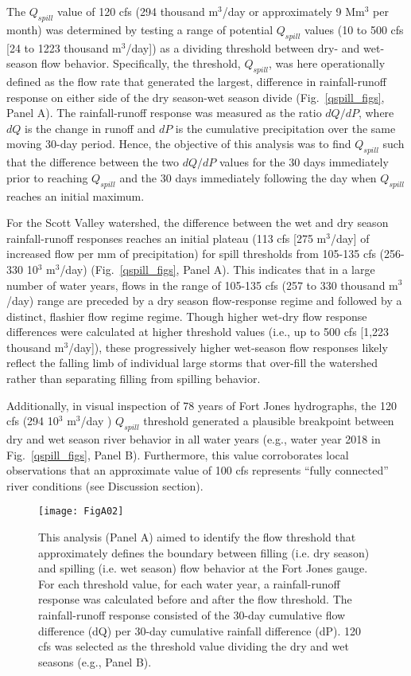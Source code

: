 \documentclass[hess, manuscript]{copernicus}
\begin{document}
The $Q_{spill}$ value of 120 cfs (294 thousand
m$^\mathrm{3}$/day or approximately 9 Mm$^\mathrm{3}$ per
month) was determined by testing a range of potential $Q_{spill}$
values (10 to 500 cfs {[}24 to 1223 thousand
m$^\mathrm{3}$/day{]}) as a dividing threshold between dry- and
wet-season flow behavior. Specifically, the threshold, $Q_{spill}$,
was here operationally defined as the flow rate that generated the
largest, difference in rainfall-runoff response on either side of the
dry season-wet season divide (Fig.~\ref{qspill_figs}, Panel A). The
rainfall-runoff response was measured as the ratio $dQ/dP$, where
$dQ$ is the change in runoff and $dP$ is the cumulative
precipitation over the same moving 30-day period. Hence, the objective
of this analysis was to find $Q_{spill}$ such that the difference
between the two $dQ/dP$ values for the 30 days immediately prior to
reaching $Q_{spill}$ and the 30 days immediately following the day
when $Q_{spill}$ reaches an initial maximum.

For the Scott Valley watershed, the difference between the wet and dry
season rainfall-runoff responses reaches an initial plateau (113 cfs
{[}275 m$^\mathrm{3}$/day{]} of increased flow per mm of
precipitation) for spill thresholds from 105-135 cfs (256-330
10$^\mathrm{3}$ m$^\mathrm{3}$/day)
(Fig.~\ref{qspill_figs}, Panel A). This indicates that in a large
number of water years, flows in the range of 105-135 cfs (257 to 330
thousand m$^\mathrm{3}$/day) range are preceded by a dry season
flow-response regime and followed by a distinct, flashier flow regime
regime. Though higher wet-dry flow response differences were calculated
at higher threshold values (i.e., up to 500 cfs {[}1,223 thousand
m$^\mathrm{3}$/day{]}), these progressively higher wet-season flow
responses likely reflect the falling limb of individual large storms
that over-fill the watershed rather than separating filling from
spilling behavior.

Additionally, in visual inspection of 78 years of Fort Jones
hydrographs, the 120 cfs (294 10$^\mathrm{3}$
m$^\mathrm{3}$/day ) $Q_{spill}$ threshold generated a plausible
breakpoint between dry and wet season river behavior in all water years
(e.g., water year 2018 in Fig.~\ref{qspill_figs}, Panel B).
Furthermore, this value corroborates local observations that an
approximate value of 100 cfs represents ``fully connected'' river
conditions (see Discussion section).

\begin{figure}
\texttt{[image: FigA02]} \caption{\label{fig:qspill_figs} This analysis (Panel A) aimed to identify the flow threshold that approximately defines the boundary between filling (i.e. dry season) and spilling (i.e. wet season) flow behavior at the Fort Jones gauge. For each threshold value, for each water year, a rainfall-runoff response was calculated before and after the flow threshold. The rainfall-runoff response consisted of the 30-day cumulative flow difference (dQ) per 30-day cumulative rainfall difference (dP). 120 cfs was selected as the threshold value dividing the dry and wet seasons (e.g., Panel B).}\label{fig:qspill_figs}
\end{figure}
\end{document}
